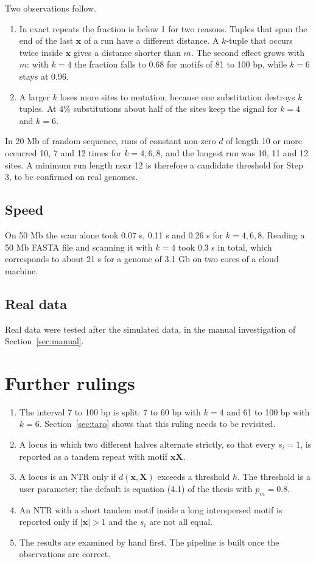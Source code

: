 \documentclass[11pt,a4paper]{article}
\begin{document}
Two observations follow.
\begin{enumerate}
\item In exact repeats the fraction is below 1 for two reasons. Tuples that
      span the end of the last $\mathbf{x}$ of a run have a different distance.
      A $k$-tuple that occurs twice inside $\mathbf{x}$ gives a distance
      shorter than $m$. The second effect grows with $m$: with $k=4$ the
      fraction falls to 0.68 for motifs of 81 to 100 bp, while $k=6$ stays at
      0.96.
\item A larger $k$ loses more sites to mutation, because one substitution
      destroys $k$ tuples. At 4\% substitutions about half of the sites keep
      the signal for $k=4$ and $k=6$.
\end{enumerate}

In 20 Mb of random sequence, runs of constant non-zero $d$ of length 10 or more
occurred 10, 7 and 12 times for $k=4,6,8$, and the longest run was 10, 11 and 12
sites. A minimum run length near 12 is therefore a candidate threshold for Step
3, to be confirmed on real genomes.

\subsection{Speed}
On 50 Mb the scan alone took 0.07 s, 0.11 s and 0.26 s for $k=4,6,8$. Reading a
50 Mb FASTA file and scanning it with $k=4$ took 0.3 s in total, which
corresponds to about 21 s for a genome of 3.1 Gb on two cores of a cloud
machine.

\subsection{Real data}
Real data were tested after the simulated data, in the manual investigation of
Section~\ref{sec:manual}.

\section{Further rulings}
\begin{enumerate}
\item The interval 7 to 100 bp is split: 7 to 60 bp with $k=4$ and 61 to 100 bp
      with $k=6$. Section~\ref{sec:taro} shows that this ruling needs to be
      revisited.
\item A locus in which two different halves alternate strictly, so that every
      $s_i=1$, is reported as a tandem repeat with motif $\mathbf{xX}$.
\item A locus is an NTR only if $d(\mathbf{x},\mathbf{X})$ exceeds a threshold
      $h$. The threshold is a user parameter; the default is equation (4.1) of
      the thesis with $p_m=0.8$.
\item An NTR with a short tandem motif inside a long interspersed motif is
      reported only if $|\mathbf{x}|>1$ and the $s_i$ are not all equal.
\item The results are examined by hand first. The pipeline is built once the
      observations are correct.
\end{enumerate}
\end{document}
